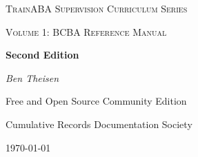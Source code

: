 \begin{titlepage}
	\centering
	{\scshape\LARGE TrainABA Supervision Curriculum Series\par}
	\vspace{1cm}
	{\scshape\Large Volume 1: BCBA Reference Manual\par}
	\vspace{1.5cm}
	{\huge\bfseries Second Edition\par}
	\vspace{2cm}
	{\Large\itshape Ben Theisen\par}
	\vfill
	Free and Open Source Community Edition \par   
	Cumulative Records Documentation Society

	\vfill

	{\large \today\par}
\end{titlepage}
%
